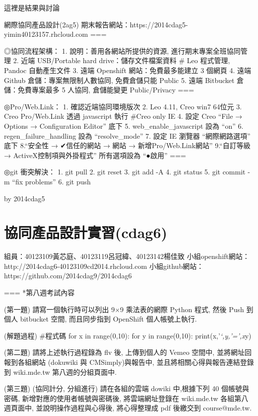 \documentclass[]{article}
\begin{document}
這裡是結果與討論

網際協同產品設計(2ag5)
期末報告網站：https://2014cdag5-yimin40123157.rhcloud.com ===

◎協同流程架構： 1. 說明：善用各網站所提供的資源,
進行期末專案全班協同管理 2. 近端 USB/Portable hard
drive：儲存文件檔案資料 \# Leo 程式管理, Pandoc 自動產生文件 3. 遠端
Openshift 網站：免費最多能建立 3 個網頁 4. 遠端 Github
倉儲：專案無限制人數協同, 免費倉儲只能 Public 5. 遠端 Bitbucket
倉儲：免費專案最多 5 人協同, 倉儲能變更 Public/Privacy ===

◎Pro/​Web.Link： 1. 確認近端協同環境版次 2. Leo 4.11, Creo win7 64位元
3. Creo Pro/​Web.Link 透過 javascript 執行 \#Creo only IE 4. 設定 Creo
``File → Options → Configuration Editor'' 底下 5.
web\_enable\_javascript 設為 ``on'' 6. regen\_failure\_handling 設為
``resolve\_mode'' 7. 設定 IE 瀏覽器 ``網際網路選項'' 底下 8.``安全性 →
✔信任的網站 → 網站 → 新增Pro/​Web.Link網站'' 9.``自訂等級 →
ActiveX控制項與外掛程式'' 所有選項設為 ``●啟用'' ===

◎git 衝突解決： 1. git pull 2. git reset 3. git add -A 4. git status 5.
git commit -m ``fix problems'' 6. git push

by 2014cdag5

\section{協同產品設計實習(cdag6)}\label{ux5354ux540cux7522ux54c1ux8a2dux8a08ux5be6ux7fd2cdag6}

組員：40123109黃芯庭、40123119呂冠緯、40123142楊佳致
小組openshift網站：http://2014cdag6-40123109cd2014.rhcloud.com
小組github網站：https://github.com/2014cdag9/2014cdag6

=== *第八週考試內容

(第一題) 請寫一個執行時可以列出 9×9 乘法表的網際 Python 程式, 然後 Push
到個人 bitbucket 空間, 而且同步指到 OpenShift 個人帳號上執行.

(解題過程) \#程式碼 for x in range(0,10): for y in range(0,10):
print(x,'\emph{`,y,'=',x}y)

(第二題) 請將上述執行過程錄為 flv 後, 上傳到個人的 Vemeo 空間中,
並將網址回報到各組網站 (dokuwiki 與 CMSimply)與報告中,
並且將相關心得與報告連結登錄到 wiki.mde.tw 第八週的分組頁面中.

(第三題) (協同計分, 分組進行) 請在各組的雲端 dowiki 中,根據下列 40
個帳號與密碼, 新增對應的使用者帳號與密碼後, 將雲端網址登錄在 wiki.mde.tw
各組第八週頁面中, 並說明操作過程與心得後, 將心得整理成 pdf 後繳交到
course@mde.tw.
\end{document}
